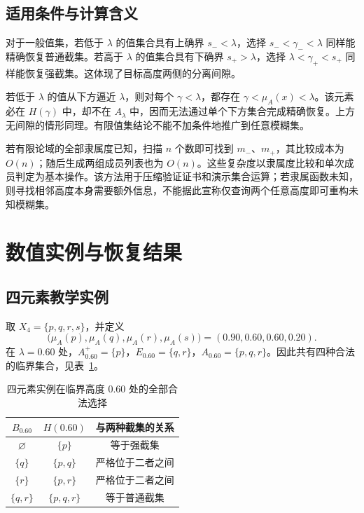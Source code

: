 \documentclass[UTF8,fontset=fandol,zihao=-4,a4paper]{ctexart}
\numberwithin{equation}{section}
\theoremstyle{reportplain}
\newcommand{\muA}{\mu_A}
\newcommand{\cut}[1]{A_{#1}}
\newcommand{\scut}[1]{A_{#1}^{+}}
\newcommand{\set}[1]{\{#1\}}
\newcommand{\eqtag}[1]{\label{#1}}
\begin{document}
\subsection{适用条件与计算含义}
对于一般值集，若低于 $\lambda$ 的值集合具有上确界 $s_-<\lambda$，选择 $s_-<\gamma_-<\lambda$ 同样能精确恢复普通截集。若高于 $\lambda$ 的值集合具有下确界 $s_+>\lambda$，选择 $\lambda<\gamma_+<s_+$ 同样能恢复强截集。这体现了目标高度两侧的分离间隙。

若低于 $\lambda$ 的值从下方逼近 $\lambda$，则对每个 $\gamma<\lambda$，都存在 $\gamma<\muA(x)<\lambda$。该元素必在 $H(\gamma)$ 中，却不在 $\cut{\lambda}$ 中，因而无法通过单个下方集合完成精确恢复。上方无间隙的情形同理。有限值集结论不能不加条件地推广到任意模糊集。

若有限论域的全部隶属度已知，扫描 $n$ 个数即可找到 $m_-$、$m_+$，其比较成本为 $O(n)$；随后生成两组成员列表也为 $O(n)$。这些复杂度以隶属度比较和单次成员判定为基本操作。该方法用于压缩验证证书和演示集合运算；若隶属函数未知，则寻找相邻高度本身需要额外信息，不能据此宣称仅查询两个任意高度即可重构未知模糊集。

\section{数值实例与恢复结果}
\subsection{四元素教学实例}
取 $X_4=\set{p,q,r,s}$，并定义
\begin{equation}
\bigl(\muA(p),\muA(q),\muA(r),\muA(s)\bigr)
=(0.90,0.60,0.60,0.20).
\eqtag{eq:demo-data}
\end{equation}
在 $\lambda=0.60$ 处，$\scut{0.60}=\set{p}$，$E_{0.60}=\set{q,r}$，$\cut{0.60}=\set{p,q,r}$。因此共有四种合法的临界集合，见表~\ref{tab:boundary}。

\begin{table}[htbp]
\centering\small
\caption{四元素实例在临界高度 0.60 处的全部合法选择}
\label{tab:boundary}
\begin{tabular}{ccc}
\toprule
$B_{0.60}$ & $H(0.60)$ & 与两种截集的关系\\
\midrule
$\varnothing$ & $\set{p}$ & 等于强截集\\
$\set{q}$ & $\set{p,q}$ & 严格位于二者之间\\
$\set{r}$ & $\set{p,r}$ & 严格位于二者之间\\
$\set{q,r}$ & $\set{p,q,r}$ & 等于普通截集\\
\bottomrule
\end{tabular}
\end{table}
\end{document}
